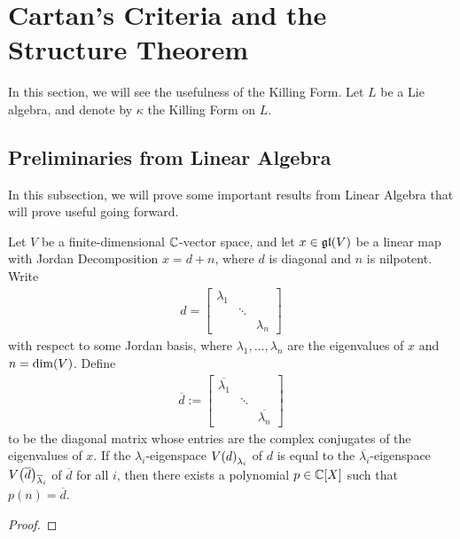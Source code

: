 \section{Cartan's Criteria and the Structure Theorem}

In this section, we will see the usefulness of the Killing Form. Let $L$ be a Lie algebra, and denote by $\kappa$ the Killing Form on $L$.

\subsection{Preliminaries from Linear Algebra}

In this subsection, we will prove some important results from Linear Algebra that will prove useful going forward.

\begin{boxlemma}\label{Ch2:Lemma:PolyConjDiag}
    Let $V$ be a finite-dimensional $\mathbb{C}$-vector space, and let $x \in \mathfrak{gl}\!\left( V \right)$ be a linear map with Jordan Decomposition $x = d + n$, where $d$ is diagonal and $n$ is nilpotent. Write
    \begin{align*}
        d = \begin{bmatrix}
                \lambda_1 & & \\
                & \ddots & \\
                & & \lambda_n
            \end{bmatrix}
    \end{align*}
    with respect to some Jordan basis, where $\lambda_1, \ldots, \lambda_n$ are the eigenvalues of $x$ and $n = \dim\!\left( V \right)$. Define
    \begin{align*}
        \overline{d} :=
        \begin{bmatrix}
            \overline{\lambda_1} & & \\
            & \ddots & \\
            & & \overline{\lambda_n}
        \end{bmatrix}
    \end{align*}
    to be the diagonal matrix whose entries are the complex conjugates of the eigenvalues of $x$. If the $\lambda_i$-eigenspace $V\!\left( d \right)_{\lambda_i}$ of $d$ is equal to the $\overline{\lambda_i}$-eigenspace $V\!\left( \overline{d} \right)_{\overline{\lambda}_i}$ of $\overline{d}$ for all $i$, then there exists a polynomial $p \in \mathbb{C}[X]$ such that $p(n) = \overline{d}$.
\end{boxlemma}
\begin{proof}
    
    \sorry
\end{proof}

